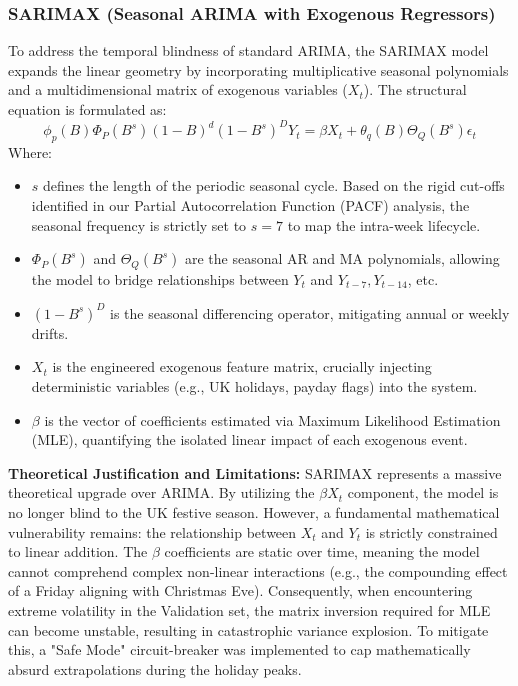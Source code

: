 \documentclass[conference, 12pt, onecolumn]{IEEEtran}
\begin{document}
\subsubsection{SARIMAX (Seasonal ARIMA with Exogenous Regressors)}
To address the temporal blindness of standard ARIMA, the SARIMAX model expands the linear geometry by incorporating multiplicative seasonal polynomials and a multidimensional matrix of exogenous variables ($X_t$). The structural equation is formulated as:
$$\phi_p(B)\Phi_P(B^s)(1 - B)^d(1 - B^s)^D Y_t = \beta X_t + \theta_q(B)\Theta_Q(B^s)\epsilon_t$$
Where:
\begin{itemize}
    \item $s$ defines the length of the periodic seasonal cycle. Based on the rigid cut-offs identified in our Partial Autocorrelation Function (PACF) analysis, the seasonal frequency is strictly set to $s = 7$ to map the intra-week lifecycle.
    \item $\Phi_P(B^s)$ and $\Theta_Q(B^s)$ are the seasonal AR and MA polynomials, allowing the model to bridge relationships between $Y_t$ and $Y_{t-7}, Y_{t-14}$, etc.
    \item $(1 - B^s)^D$ is the seasonal differencing operator, mitigating annual or weekly drifts.
    \item $X_t$ is the engineered exogenous feature matrix, crucially injecting deterministic variables (e.g., UK holidays, payday flags) into the system.
    \item $\beta$ is the vector of coefficients estimated via Maximum Likelihood Estimation (MLE), quantifying the isolated linear impact of each exogenous event.
\end{itemize}
\textbf{Theoretical Justification and Limitations:} SARIMAX represents a massive theoretical upgrade over ARIMA. By utilizing the $\beta X_t$ component, the model is no longer blind to the UK festive season. However, a fundamental mathematical vulnerability remains: the relationship between $X_t$ and $Y_t$ is strictly constrained to linear addition. The $\beta$ coefficients are static over time, meaning the model cannot comprehend complex non-linear interactions (e.g., the compounding effect of a Friday aligning with Christmas Eve). Consequently, when encountering extreme volatility in the Validation set, the matrix inversion required for MLE can become unstable, resulting in catastrophic variance explosion. To mitigate this, a "Safe Mode" circuit-breaker was implemented to cap mathematically absurd extrapolations during the holiday peaks.
\end{document}

